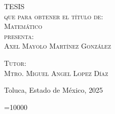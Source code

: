 \documentclass[letterpaper,12pt,oneside]{book}
\begin{document}
\begin{titlepage}
\begin{minipage}[c][0.81\textheight][t]{0.75\textwidth}
\begin{center}
                \vspace{2cm}            

                \textsc{\LARGE T\hspace{1.5cm}E\hspace{1.5cm}S\hspace{1.5cm}I\hspace{1.5cm}S}\\[0.5cm]
                \textsc{\large que para obtener el t\'itulo de:}\\[0.5cm]
                \textsc{\large Matemático}\\[0.5cm]
                \textsc{\large presenta:}\\[0.5cm]
                \textsc{\large {Axel Mayolo Martínez González}}\\[2cm]          

                \vspace{0.5cm}

                {\large\scshape Tutor:\\[0.3cm] {Mtro. Miguel Angel Lopez Díaz 
			}}\\[.2in]

                \vspace{0.5cm}

                \large{Toluca, Estado de México,}{ }{2025}
            \end{center}
        \end{minipage}
    \end{titlepage}



\frontmatter
\newtheorem{namedthm}{}

\newenvironment{namedtheorem}[1]
  {\renewcommand\thenamedthm{#1}\namedthm}

\interfootnotelinepenalty=10000

\end{document}
